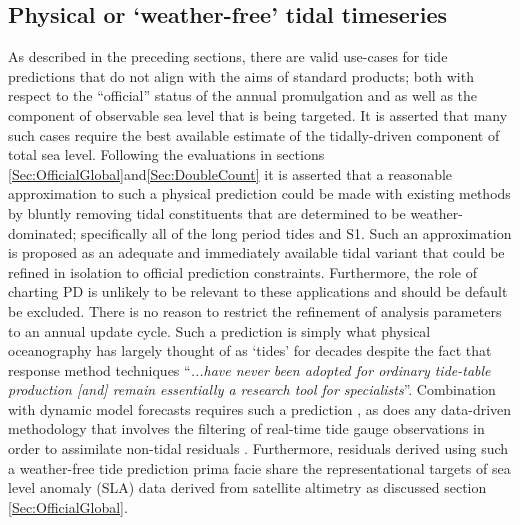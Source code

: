 \subsection{Physical or `weather-free' tidal timeseries}   
\label{Sec:flavour2}
As described in the preceding sections, there are valid use-cases for tide predictions that do not align with the aims of standard products;  both with respect to the ``official'' status of the annual promulgation and as well as the component of observable sea level that is being targeted.  It is asserted that many such cases require the best available estimate of the tidally-driven component of total sea level.  
Following the evaluations in sections \ref{Sec:OfficialGlobal}and\ref{Sec:DoubleCount} it is asserted that a reasonable approximation to such a physical prediction could be made with existing methods by bluntly removing tidal constituents that are determined to be weather-dominated; specifically all of the long period tides and S1.   Such an approximation is proposed as an adequate and immediately available tidal variant that could be refined in isolation to official prediction constraints. Furthermore, the role of charting PD is unlikely to be relevant to these applications and should be default be excluded.
There is no reason to restrict the refinement of analysis parameters to an annual update cycle.
Such a prediction is simply what physical oceanography has largely thought of as `tides' for decades \cite{Munk:1966ts} despite the fact that response method techniques ``\textit{...have never been adopted for ordinary tide-table production [and] remain essentially a research tool for specialists}''\citep[p.198]{Cartwright:2000tt}.
Combination with dynamic model forecasts requires such a prediction \citep{Taylor:2017coa}, as does any data-driven methodology that involves the filtering of real-time tide gauge observations in order to assimilate non-tidal residuals \cite{10.3389/fmars.2019.00437}. Furthermore, residuals derived using such a weather-free tide prediction prima facie share the representational targets of sea level anomaly (SLA) data derived from satellite altimetry as discussed section \ref{Sec:OfficialGlobal}.
      
